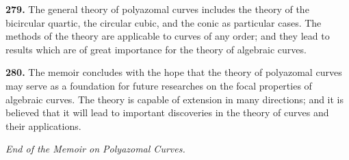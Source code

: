 \documentclass[12pt,a4paper]{article}
\theoremstyle{definition}
\begin{document}
\noindent\textbf{279.} The general theory of polyazomal curves includes the theory of the
bicircular quartic, the circular cubic, and the conic as particular cases. The methods
of the theory are applicable to curves of any order; and they lead to results which are
of great importance for the theory of algebraic curves.

\noindent\textbf{280.} The memoir concludes with the hope that the theory of polyazomal curves
may serve as a foundation for future researches on the focal properties of algebraic
curves. The theory is capable of extension in many directions; and it is believed that
it will lead to important discoveries in the theory of curves and their applications.

\vspace{2em}
\begin{flushright}
\textit{End of the Memoir on Polyazomal Curves.}
\end{flushright}
\end{document}
